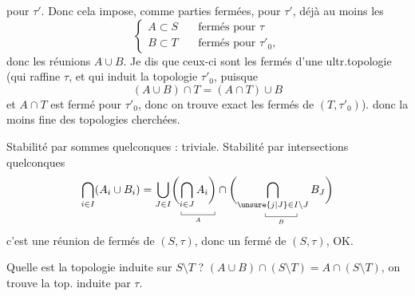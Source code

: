 pour $ \tau'$. Donc cela impose, comme parties fermées, pour $\tau'$, déjà au moins les
\[
\left\{\begin{aligned}
 A\subset S&\quad\text{fermés pour }\tau\\
 B\subset T&\quad\text{fermés pour }\tau'_0,
\end{aligned}\right.
\]
donc les réunions $A\cup B$. Je dis que ceux-ci sont  les fermés d'une ultr.topologie (qui  raffine $\tau$, et qui induit la topologie $\tau'_0$, puisque
\[
 (A\cup B)\cap T=(A\cap T)\cup B
\]
et $A\cap T$ est fermé pour $\tau'_0$, donc on trouve exact les fermés de $(T,\tau'_0)$).
 donc la  moins fine des topologies cherchées.

 Stabilité par sommes quelconques : triviale. Stabilité par intersections quelconques
\[
 \bigcap_{i\in I}(A_i\cup B_i)=
 \bigcup_{J\in I}
 \biggl(\underset{\underset{A}{\rule{.35pt}{.3em}\rule{3em}{.35pt}\rule{.35pt}{.3em}}}{\bigcap_{i\in J}A_i\biggr)}
 \cap\biggl(\underset{\underset{B}{\rule{.35pt}{.3em}\rule{2.8em}{.35pt}\rule{.35pt}{.3em}}}{\bigcap_{\unsure{j|J}\in I\setminus J} B_J}\biggr)
\]
c'est une réunion de fermés de $(S,\tau)$, donc un fermé de $(S,\tau)$, OK.

Quelle est la topologie induite  sur $S\setminus T$ ? $(A\cup B)\cap(S\setminus T)=A\cap(S\setminus T)$, on trouve la top. induite par $\tau$.

